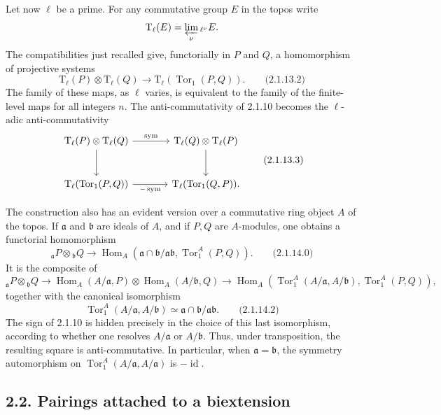 \documentclass[11pt]{article}
\providecommand{\Tor}{\operatorname{Tor}}
\providecommand{\Hom}{\operatorname{Hom}}
\providecommand{\id}{\operatorname{id}}
\providecommand{\Tate}{\mathrm T}
\providecommand{\Tor}{\operatorname{Tor}}
\providecommand{\Hom}{\operatorname{Hom}}
\providecommand{\id}{\mathrm{id}}
\begin{document}
Let now \(\ell\) be a prime.  For any commutative group \(E\) in the topos write
\[
        \Tate_\ell(E)=\varprojlim_\nu {}_{\ell^\nu}E.
\]
The compatibilities just recalled give, functorially in \(P\) and \(Q\), a homomorphism of projective systems
\[
        \Tate_\ell(P)\otimes \Tate_\ell(Q)
        \longrightarrow \Tate_\ell(\Tor_1(P,Q)).
\qquad\text{(2.1.13.2)}
\]
The family of these maps, as \(\ell\) varies, is equivalent to the family of the finite-level maps for all integers \(n\).  The anti-commutativity of 2.1.10 becomes the \(\ell\)-adic anti-commutativity
\[
\begin{tikzcd}[column sep=large,row sep=large]
 \Tate_\ell(P)\otimes \Tate_\ell(Q) \arrow[r,"\mathrm{sym}"]\arrow[d] &
 \Tate_\ell(Q)\otimes \Tate_\ell(P)\arrow[d]\\
 \Tate_\ell(\Tor_1(P,Q))\arrow[r,"-\,\mathrm{sym}"'] &
 \Tate_\ell(\Tor_1(Q,P)).
\end{tikzcd}
\qquad\text{(2.1.13.3)}
\]

The construction also has an evident version over a commutative ring object \(A\) of the topos.  If \(\mathfrak a\) and \(\mathfrak b\) are ideals of \(A\), and if \(P,Q\) are \(A\)-modules, one obtains a functorial homomorphism
\[
        {}_{\mathfrak a}P\otimes {}_{\mathfrak b}Q
        \longrightarrow
        \Hom_A(\mathfrak a\cap\mathfrak b/\mathfrak a\mathfrak b,\Tor_1^A(P,Q)).
\qquad\text{(2.1.14.0)}
\]
It is the composite of
\[
{}_{\mathfrak a}P\otimes {}_{\mathfrak b}Q
\longrightarrow
\Hom_A(A/\mathfrak a,P)\otimes \Hom_A(A/\mathfrak b,Q)
\longrightarrow
\Hom_A(\Tor_1^A(A/\mathfrak a,A/\mathfrak b),\Tor_1^A(P,Q)),
\]
together with the canonical isomorphism
\[
        \Tor_1^A(A/\mathfrak a,A/\mathfrak b)
        \simeq
        \mathfrak a\cap\mathfrak b/\mathfrak a\mathfrak b.
\qquad\text{(2.1.14.2)}
\]
The sign of 2.1.10 is hidden precisely in the choice of this last isomorphism, according to whether one resolves \(A/\mathfrak a\) or \(A/\mathfrak b\).  Thus, under transposition, the resulting square is anti-commutative.  In particular, when \(\mathfrak a=\mathfrak b\), the symmetry automorphism on \(\Tor_1^A(A/\mathfrak a,A/\mathfrak a)\) is \(-\id\).

\subsection*{2.2. Pairings attached to a biextension}
\end{document}
